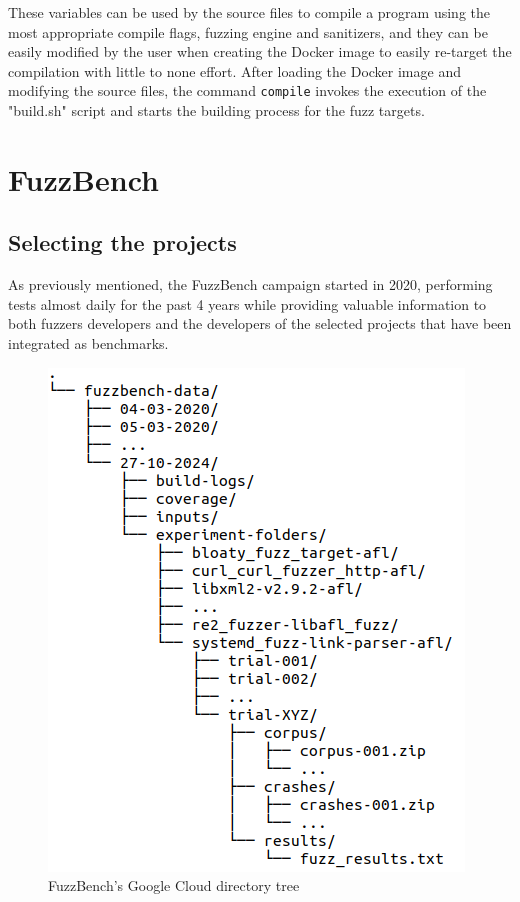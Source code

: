 These variables can be used by the source files to compile a program using the most appropriate compile flags, fuzzing engine and sanitizers, and they can be easily modified by the user when creating the Docker image to easily re-target the compilation with little to none effort.
After loading the Docker image and modifying the source files, the command \verb|compile| invokes the execution of the "build.sh" script and starts the building process for the fuzz targets.

\newpage
\section{FuzzBench}
\subsection{Selecting the projects}
As previously mentioned, the FuzzBench campaign started in 2020, performing tests almost daily for the past 4 years while providing valuable information to both fuzzers developers and the developers of the selected projects that have been integrated as benchmarks.
\begin{figure}[h]
\centering
\includegraphics[scale=0.4]{foto/tree.png}
\caption{FuzzBench's Google Cloud directory tree}
\label{fig:tree}
\end{figure}

